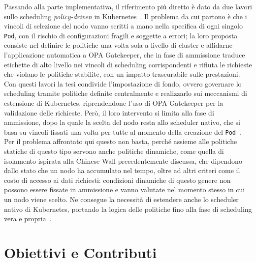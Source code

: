 Passando alla parte implementativa, il riferimento più diretto è dato da due lavori sullo scheduling \emph{policy-driven} in Kubernetes~\cite{policy-driven-sec-aware-scheduling-k8s, secure-k8s-workload-deployment}. Il problema da cui partono è che i vincoli di selezione del nodo vanno scritti a mano nella specifica di ogni singolo \texttt{Pod}, con il rischio di configurazioni fragili e soggette a errori; la loro proposta consiste nel definire le politiche una volta sola a livello di cluster e affidarne l'applicazione automatica a OPA Gatekeeper, che in fase di ammissione traduce etichette di alto livello nei vincoli di scheduling corrispondenti e rifiuta le richieste che violano le politiche stabilite, con un impatto trascurabile sulle prestazioni. Con questi lavori la tesi condivide l'impostazione di fondo, ovvero governare lo scheduling tramite politiche definite centralmente e realizzarlo sui meccanismi di estensione di Kubernetes, riprendendone l'uso di OPA Gatekeeper per la validazione delle richieste. Però, il loro intervento si limita alla fase di ammissione, dopo la quale la scelta del nodo resta allo scheduler nativo, che si basa su vincoli fissati una volta per tutte al momento della creazione del \texttt{Pod}~\cite{k8s-scheduler}. Per il problema affrontato qui questo non basta, perché assieme alle politiche statiche di questo tipo servono anche politiche dinamiche, come quella di isolamento ispirata alla Chinese Wall precedentemente discussa, che dipendono dallo stato che un nodo ha accumulato nel tempo, oltre ad altri criteri come il costo di accesso ai dati richiesti: condizioni dinamiche di questo genere non possono essere fissate in ammissione e vanno valutate nel momento stesso in cui un nodo viene scelto. Ne consegue la necessità di estendere anche lo scheduler nativo di Kubernetes, portando la logica delle politiche fino alla fase di scheduling vera e propria~\cite{k8s-scheduler-framework}.


\section{Obiettivi e Contributi}
\label{sec:obiettivi}

